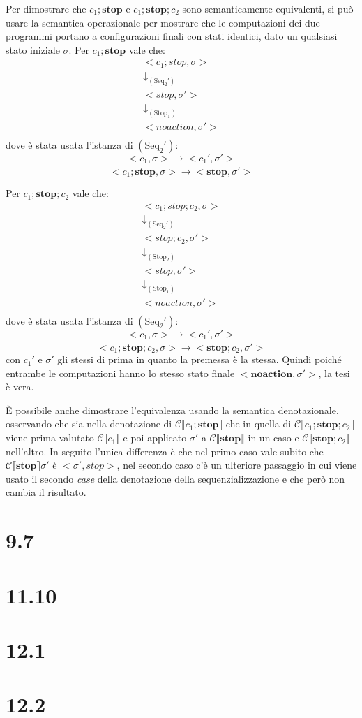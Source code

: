 \documentclass[a4paper,twosides]{report}
\begin{document}
Per dimostrare che $c_1;\mathbf{stop}$ e $c_1;\mathbf{stop};c_2$ sono
semanticamente equivalenti, si pu\`o usare la semantica operazionale
per mostrare che le computazioni dei due programmi portano a
configurazioni finali con stati identici, dato
un qualsiasi
stato iniziale $\sigma$.
Per $c_1;\mathbf{stop}$ vale che:
\begin{gather*}
  <c_1;stop,\sigma>\\
  \downarrow_{(\text{Seq}_2')}\\
  <stop,\sigma'>\\
  \downarrow_{(\text{Stop}_1)}\\
  <noaction,\sigma'>\\
\end{gather*}
dove \`e stata usata l'istanza di $(\text{Seq}_2')$:
$$
\frac{<c_1,\sigma> \longrightarrow{}
  <c_1',\sigma'>}{<c_1;\mathbf{stop},\sigma> \longrightarrow{}
  <\mathbf{stop},\sigma'>}
$$

Per $c_1;\mathbf{stop};c_2$ vale che:
\begin{gather*}
  <c_1;stop;c_2,\sigma>\\
  \downarrow_{(\text{Seq}_2')}\\
  <stop;c_2,\sigma'>\\
  \downarrow_{(\text{Stop}_2)}\\
  <stop,\sigma'>\\
  \downarrow_{(\text{Stop}_1)}\\
  <noaction,\sigma'>\\
\end{gather*}
dove \`e stata usata l'istanza di $(\text{Seq}_2')$:
$$
\frac{<c_1,\sigma> \longrightarrow{}
  <c_1',\sigma'>}{<c_1;\mathbf{stop};c_2,\sigma> \longrightarrow{}
  <\mathbf{stop};c_2,\sigma'>}
$$
con $c_1'$ e $\sigma'$ gli stessi di prima in quanto la premessa è la
stessa. Quindi poich\'e entrambe le computazioni hanno lo stesso stato
finale $<\mathbf{noaction},\sigma'>$, la tesi
\`e vera.

\`E possibile anche dimostrare l'equivalenza usando la semantica
denotazionale, osservando che sia nella denotazione di $\mathcal{C}\llbracket
c_1;\mathbf{stop}\rrbracket$ che in quella di $\mathcal{C}\llbracket
c_1;\mathbf{stop};c_2\rrbracket$ viene prima valutato $\mathcal{C}\llbracket
c_1\rrbracket$ e poi applicato $\sigma'$ a $\mathcal{C}\llbracket
\mathbf{stop}\rrbracket$ in un caso e $\mathcal{C}\llbracket
\mathbf{stop};c_2\rrbracket$ nell'altro. In seguito l'unica differenza
\`e che nel primo caso vale subito che $\mathcal{C}\llbracket
\mathbf{stop}\rrbracket\sigma'$ \`e $<\sigma',stop>$, nel secondo caso
c'è un ulteriore passaggio in cui viene usato il secondo \emph{case}
della denotazione della sequenzializzazione e che per\`o non cambia il
risultato.


\section*{9.7}

\section*{11.10}

\section*{12.1}

\section*{12.2}
 
\end{document}
